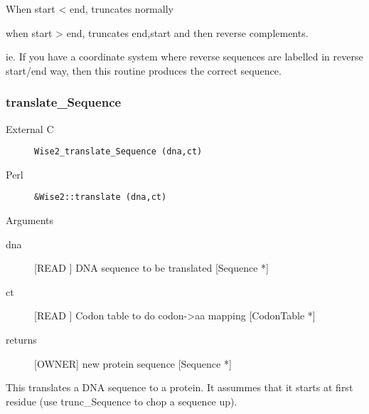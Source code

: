 When start < end, truncates normally


when start > end, truncates end,start and then
reverse complements.


ie. If you have a coordinate system where reverse 
sequences are labelled in reverse start/end way,
then this routine produces the correct sequence.


\subsubsection{translate_Sequence}
\begin{description}
\item[External C] {\tt Wise2_translate_Sequence (dna,ct)}
\item[Perl] {\tt &Wise2::translate (dna,ct)}

\end{description}
Arguments
\begin{description}
\item[dna] [READ ] DNA sequence to be translated [Sequence *]
\item[ct] [READ ] Codon table to do codon->aa mapping [CodonTable *]
\item[returns] [OWNER] new protein sequence [Sequence *]
\end{description}
This translates a DNA sequence to a protein.
It assummes that it starts at first residue
(use trunc_Sequence to chop a sequence up).




